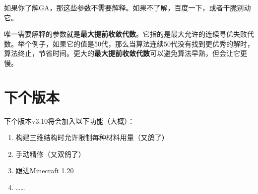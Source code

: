 \documentclass[UTF8]{ctexart}
\begin{document}
如果你了解GA，那这些参数不需要解释。如果不了解，百度一下，或者干脆别动它。

唯一需要解释的参数就是\textbf{最大提前收敛代数}。它指的是最大允许的连续寻优失败代数。举个例子，如果它的值是50代，那么当算法连续50代没有找到更优秀的解时，算法终止，节省时间。更大的\textbf{最大提前收敛代数}可以避免算法早熟，但会让它更慢。

\section{下个版本}
下个版本v3.10将会加入以下功能（大概）：
\begin{enumerate}
    \item 构建三维结构时允许限制每种材料用量（又鸽了）
    \item 手动精修（又双鸽了）
    \item 跟进Minecraft 1.20
    \item ……
\end{enumerate}
\end{document}
